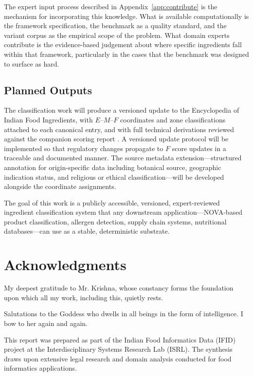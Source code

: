 \documentclass[12pt,a3paper]{article}
\begin{document}
The expert input process described in Appendix~\ref{app:contribute} is the mechanism for incorporating this knowledge. What is available computationally is the framework specification, the benchmark as a quality standard, and the variant corpus as the empirical scope of the problem. What domain experts contribute is the evidence-based judgement about where specific ingredients fall within that framework, particularly in the cases that the benchmark was designed to surface as hard.

\subsection{Planned Outputs}

The classification work will produce a versioned update to the Encyclopedia of Indian Food Ingredients, with $E$--$M$--$F$ coordinates and zone classifications attached to each canonical entry, and with full technical derivations reviewed against the companion scoring report \cite{EMF_JustificationCompanion}. A versioned update protocol will be implemented so that regulatory changes propagate to $F$ score updates in a traceable and documented manner. The source metadata extension---structured annotation for origin-specific data including botanical source, geographic indication status, and religious or ethical classification---will be developed alongside the coordinate assignments.

The goal of this work is a publicly accessible, versioned, expert-reviewed ingredient classification system that any downstream application---NOVA-based product classification, allergen detection, supply chain systems, nutritional databases---can use as a stable, deterministic substrate.

\newpage

\section*{Acknowledgments}

My deepest gratitude to Mr. Krishna, whose constancy forms the foundation upon which all my work, including this, quietly rests.

Salutations to the Goddess who dwells in all beings in the form of intelligence. I bow to her again and again.

This report was prepared as part of the Indian Food Informatics Data (IFID) project at the Interdisciplinary Systems Research Lab (ISRL). The synthesis draws upon extensive legal research and domain analysis conducted for food informatics applications.
\end{document}
